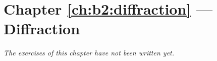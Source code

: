 \section*{Chapter \ref{ch:b2:diffraction} --- Diffraction}


\emph{The exercises of this chapter have not been written yet.}

